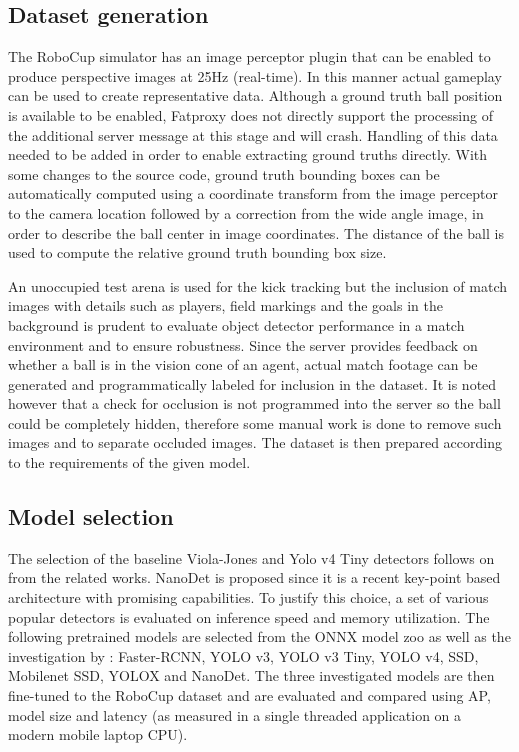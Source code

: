 \documentclass[a4paper,twoside,12pt]{report}
\begin{document}
\subsection{Dataset generation}

The RoboCup simulator has an image perceptor plugin that can be enabled to produce perspective images at 25Hz (real-time). In this manner actual gameplay can be used to create representative data. Although a ground truth ball position is available to be enabled, Fatproxy does not directly support the processing of the additional server message at this stage and will crash. Handling of this data needed to be added in order to enable extracting ground truths directly. With some changes to the source code, ground truth bounding boxes can be automatically computed using a coordinate transform from the image perceptor to the camera location followed by a correction from the wide angle image, in order to describe the ball center in image coordinates. The distance of the ball is used to compute the relative ground truth bounding box size.

An unoccupied test arena is used for the kick tracking but the inclusion of match images with details such as players, field markings and the goals in the background is prudent to evaluate object detector performance in a match environment and to ensure robustness. Since the server provides feedback on whether a ball is in the vision cone of an agent, actual match footage can be generated and programmatically labeled for inclusion in the dataset. It is noted however that a check for occlusion is not programmed into the server so the ball could be completely hidden, therefore some manual work is done to remove such images and to separate occluded images. The dataset is then prepared according to the requirements of the given model.

\subsection{Model selection}

The selection of the baseline Viola-Jones and Yolo v4 Tiny detectors follows on from the related works. NanoDet is proposed since it is a recent key-point based architecture with promising capabilities. To justify this choice, a set of various popular detectors is evaluated on inference speed and memory utilization. The following pretrained models are selected from the ONNX model zoo \citep{modelzoo} as well as the investigation by \cite{comprehensive}: Faster-RCNN, YOLO v3, YOLO v3 Tiny, YOLO v4, SSD, Mobilenet SSD, YOLOX and NanoDet. The three investigated models are then fine-tuned to the RoboCup dataset and are evaluated and compared using AP, model size and latency (as measured in a single threaded application on a modern mobile laptop CPU).
\end{document}
